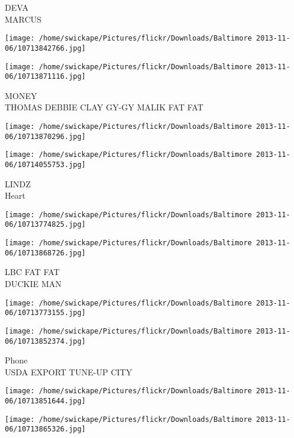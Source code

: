 \documentclass[10pt,letterpaper]{article}
\begin{document}
DEVA\\
MARCUS\\
\pagebreak

\texttt{[image: /home/swickape/Pictures/flickr/Downloads/Baltimore 2013-11-06/10713842766.jpg]}

\vspace{0.25in}
\texttt{[image: /home/swickape/Pictures/flickr/Downloads/Baltimore 2013-11-06/10713871116.jpg]}

MONEY\\
THOMAS DEBBIE CLAY GY{-}GY MALIK FAT FAT\\
\pagebreak

\texttt{[image: /home/swickape/Pictures/flickr/Downloads/Baltimore 2013-11-06/10713870296.jpg]}

\vspace{0.25in}
\texttt{[image: /home/swickape/Pictures/flickr/Downloads/Baltimore 2013-11-06/10714055753.jpg]}

LINDZ\\
Heart\\
\pagebreak

\texttt{[image: /home/swickape/Pictures/flickr/Downloads/Baltimore 2013-11-06/10713774825.jpg]}

\vspace{0.25in}
\texttt{[image: /home/swickape/Pictures/flickr/Downloads/Baltimore 2013-11-06/10713868726.jpg]}

LBC FAT FAT\\
DUCKIE MAN\\
\pagebreak

\texttt{[image: /home/swickape/Pictures/flickr/Downloads/Baltimore 2013-11-06/10713773155.jpg]}

\vspace{0.25in}
\texttt{[image: /home/swickape/Pictures/flickr/Downloads/Baltimore 2013-11-06/10713852374.jpg]}

Phone\\
USDA EXPORT TUNE{-}UP CITY\\
\pagebreak

\texttt{[image: /home/swickape/Pictures/flickr/Downloads/Baltimore 2013-11-06/10713851644.jpg]}

\vspace{0.25in}
\texttt{[image: /home/swickape/Pictures/flickr/Downloads/Baltimore 2013-11-06/10713865326.jpg]}
\end{document}

